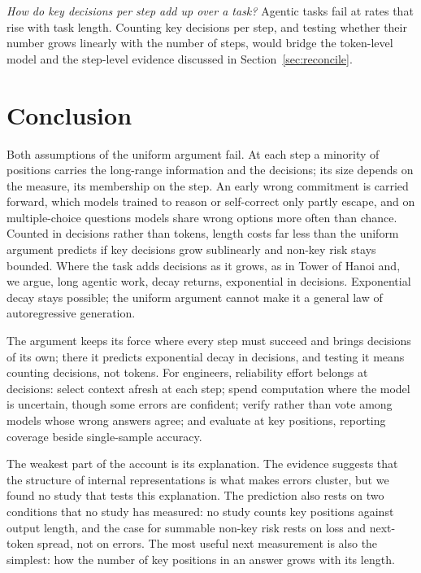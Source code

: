 \documentclass{ieeeaccess}
\begin{document}
\emph{How do key decisions per step add up over a task?} Agentic tasks fail at rates that rise with task length. Counting key decisions per step, and testing whether their number grows linearly with the number of steps, would bridge the token-level model and the step-level evidence discussed in Section~\ref{sec:reconcile}.

\section{Conclusion}
\label{sec:conclusion}
Both assumptions of the uniform argument fail. At each step a minority of positions carries the long-range information and the decisions; its size depends on the measure, its membership on the step. An early wrong commitment is carried forward, which models trained to reason or self-correct only partly escape, and on multiple-choice questions models share wrong options more often than chance. Counted in decisions rather than tokens, length costs far less than the uniform argument predicts if key decisions grow sublinearly and non-key risk stays bounded. Where the task adds decisions as it grows, as in Tower of Hanoi and, we argue, long agentic work, decay returns, exponential in decisions. Exponential decay stays possible; the uniform argument cannot make it a general law of autoregressive generation.

The argument keeps its force where every step must succeed and brings decisions of its own; there it predicts exponential decay in decisions, and testing it means counting decisions, not tokens. For engineers, reliability effort belongs at decisions: select context afresh at each step; spend computation where the model is uncertain, though some errors are confident; verify rather than vote among models whose wrong answers agree; and evaluate at key positions, reporting coverage beside single-sample accuracy.

The weakest part of the account is its explanation. The evidence suggests that the structure of internal representations is what makes errors cluster, but we found no study that tests this explanation. The prediction also rests on two conditions that no study has measured: no study counts key positions against output length, and the case for summable non-key risk rests on loss and next-token spread, not on errors. The most useful next measurement is also the simplest: how the number of key positions in an answer grows with its length.
\end{document}
